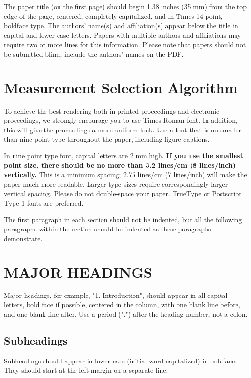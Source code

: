 \documentclass{article}
\begin{document}
The paper title (on the first page) should begin 1.38 inches (35 mm) from the
top edge of the page, centered, completely capitalized, and in Times 14-point,
boldface type.  The authors' name(s) and affiliation(s) appear below the title
in capital and lower case letters.  Papers with multiple authors and
affiliations may require two or more lines for this information. Please note
that papers should not be submitted blind; include the authors' names on the
PDF.

\section{Measurement Selection Algorithm}
\label{sec:typestyle}

To achieve the best rendering both in printed proceedings and electronic proceedings, we
strongly encourage you to use Times-Roman font.  In addition, this will give
the proceedings a more uniform look.  Use a font that is no smaller than nine
point type throughout the paper, including figure captions.

In nine point type font, capital letters are 2 mm high.  {\bf If you use the
smallest point size, there should be no more than 3.2 lines/cm (8 lines/inch)
vertically.}  This is a minimum spacing; 2.75 lines/cm (7 lines/inch) will make
the paper much more readable.  Larger type sizes require correspondingly larger
vertical spacing.  Please do not double-space your paper.  TrueType or
Postscript Type 1 fonts are preferred.

The first paragraph in each section should not be indented, but all the
following paragraphs within the section should be indented as these paragraphs
demonstrate.

\section{MAJOR HEADINGS}
\label{sec:majhead}

Major headings, for example, "1. Introduction", should appear in all capital
letters, bold face if possible, centered in the column, with one blank line
before, and one blank line after. Use a period (".") after the heading number,
not a colon.

\subsection{Subheadings}
\label{ssec:subhead}

Subheadings should appear in lower case (initial word capitalized) in
boldface.  They should start at the left margin on a separate line.
\end{document}
